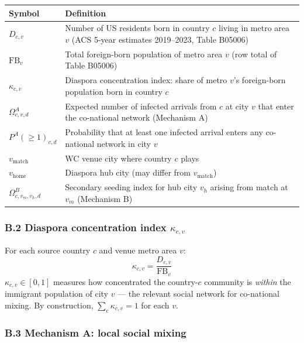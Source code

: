 \documentclass[12pt, a4paper]{article}
\begin{document}
\begin{center}
\small
\begin{tabular}{p{2.8cm} p{9.5cm}}
\toprule
\textbf{Symbol} & \textbf{Definition} \\
\midrule
$D_{c,v}$            & Number of US residents born in country $c$
                       living in metro area $v$
                       (ACS 5-year estimates 2019--2023, Table B05006) \\
$\mathrm{FB}_{v}$    & Total foreign-born population of metro area $v$
                       (row total of Table B05006) \\
$\kappa_{c,v}$       & Diaspora concentration index: share of metro
                       $v$'s foreign-born population born in country $c$ \\
$\Omega^A_{c,v,d}$   & Expected number of infected arrivals from $c$
                       at city $v$ that enter the co-national network
                       (Mechanism A) \\
$P^A(\geq 1)_{v,d}$  & Probability that at least one infected arrival
                       enters any co-national network in city $v$ \\
$v_{\text{match}}$   & WC venue city where country $c$ plays \\
$v_{\text{home}}$    & Diaspora hub city (may differ from
                       $v_{\text{match}}$) \\
$\Omega^B_{c,v_m,v_h,d}$ & Secondary seeding index for hub city
                       $v_h$ arising from match at $v_m$ (Mechanism B) \\
\bottomrule
\end{tabular}
\end{center}

\subsubsection*{B.2 Diaspora concentration index $\kappa_{c,v}$}

For each source country $c$ and venue metro area $v$:
\[
  \kappa_{c,v} = \frac{D_{c,v}}{\mathrm{FB}_{v}}
\]
$\kappa_{c,v} \in [0,1]$ measures how concentrated the country-$c$
community is \emph{within} the immigrant population of city $v$ ---
the relevant social network for co-national mixing. By construction,
$\sum_c \kappa_{c,v} = 1$ for each $v$.

\subsubsection*{B.3 Mechanism A: local social mixing}
\end{document}
